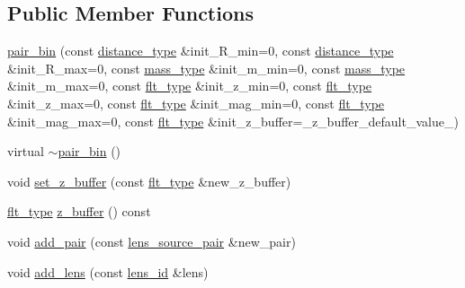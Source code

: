 \subsection*{Public Member Functions}
\begin{DoxyCompactItemize}
\item 
\hyperlink{classIceBRG_1_1pair__bin_ab951efb7c961a3910cd30e4eab58fbbf}{pair\-\_\-bin} (const \hyperlink{namespaceIceBRG_a45499647eb87e24c10ab32c628711cec}{distance\-\_\-type} \&init\-\_\-\-R\-\_\-min=0, const \hyperlink{namespaceIceBRG_a45499647eb87e24c10ab32c628711cec}{distance\-\_\-type} \&init\-\_\-\-R\-\_\-max=0, const \hyperlink{namespaceIceBRG_a1be72ac4918a9b029f2eefa084213e35}{mass\-\_\-type} \&init\-\_\-m\-\_\-min=0, const \hyperlink{namespaceIceBRG_a1be72ac4918a9b029f2eefa084213e35}{mass\-\_\-type} \&init\-\_\-m\-\_\-max=0, const \hyperlink{lib_2IceBRG__main_2common_8h_ad0f130a56eeb944d9ef2692ee881ecc4}{flt\-\_\-type} \&init\-\_\-z\-\_\-min=0, const \hyperlink{lib_2IceBRG__main_2common_8h_ad0f130a56eeb944d9ef2692ee881ecc4}{flt\-\_\-type} \&init\-\_\-z\-\_\-max=0, const \hyperlink{lib_2IceBRG__main_2common_8h_ad0f130a56eeb944d9ef2692ee881ecc4}{flt\-\_\-type} \&init\-\_\-mag\-\_\-min=0, const \hyperlink{lib_2IceBRG__main_2common_8h_ad0f130a56eeb944d9ef2692ee881ecc4}{flt\-\_\-type} \&init\-\_\-mag\-\_\-max=0, const \hyperlink{lib_2IceBRG__main_2common_8h_ad0f130a56eeb944d9ef2692ee881ecc4}{flt\-\_\-type} \&init\-\_\-z\-\_\-buffer=\-\_\-z\-\_\-buffer\-\_\-default\-\_\-value\-\_\-)
\item 
virtual \hyperlink{classIceBRG_1_1pair__bin_a66e756e18910966d7455a3bf35e39b7d}{$\sim$pair\-\_\-bin} ()
\item 
void \hyperlink{classIceBRG_1_1pair__bin_a679b3e87b4414c9ef2f2192e46ca5dbe}{set\-\_\-z\-\_\-buffer} (const \hyperlink{lib_2IceBRG__main_2common_8h_ad0f130a56eeb944d9ef2692ee881ecc4}{flt\-\_\-type} \&new\-\_\-z\-\_\-buffer)
\item 
\hyperlink{lib_2IceBRG__main_2common_8h_ad0f130a56eeb944d9ef2692ee881ecc4}{flt\-\_\-type} \hyperlink{classIceBRG_1_1pair__bin_a3712b1f0714d9c7dbd4e3f8bb5f92bdd}{z\-\_\-buffer} () const 
\item 
void \hyperlink{classIceBRG_1_1pair__bin_a2e97e0e531f74f95285029f40af20f04}{add\-\_\-pair} (const \hyperlink{classIceBRG_1_1lens__source__pair}{lens\-\_\-source\-\_\-pair} \&new\-\_\-pair)
\item 
void \hyperlink{classIceBRG_1_1pair__bin_a64e16e56545c85dd67180c9205c554eb}{add\-\_\-lens} (const \hyperlink{structIceBRG_1_1lens__id}{lens\-\_\-id} \&lens)

\end{DoxyCompactItemize}
